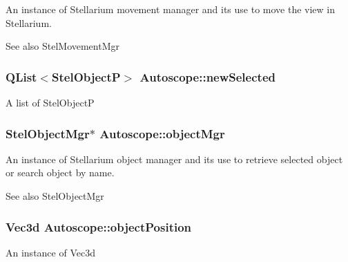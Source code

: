 An instance of Stellarium movement manager and it\textquotesingle{}s use to move the view in Stellarium. 

\begin{DoxySeeAlso}{See also}
Stel\+Movement\+Mgr 
\end{DoxySeeAlso}
\subsubsection[{\texorpdfstring{new\+Selected}{newSelected}}]{\setlength{\rightskip}{0pt plus 5cm}Q\+List$<$Stel\+ObjectP$>$ Autoscope\+::new\+Selected\hspace{0.3cm}{\ttfamily [private]}}\hypertarget{class_autoscope_aa02f096fc07e27ef3843eb4f8ba2c5a5}{}\label{class_autoscope_aa02f096fc07e27ef3843eb4f8ba2c5a5}
A list of Stel\+ObjectP 
\subsubsection[{\texorpdfstring{object\+Mgr}{objectMgr}}]{\setlength{\rightskip}{0pt plus 5cm}Stel\+Object\+Mgr$\ast$ Autoscope\+::object\+Mgr}\hypertarget{class_autoscope_aec2c452e45c0a7d045417a8656aa7c45}{}\label{class_autoscope_aec2c452e45c0a7d045417a8656aa7c45}


An instance of Stellarium object manager and it\textquotesingle{}s use to retrieve selected object or search object by name. 

\begin{DoxySeeAlso}{See also}
Stel\+Object\+Mgr 
\end{DoxySeeAlso}
\subsubsection[{\texorpdfstring{object\+Position}{objectPosition}}]{\setlength{\rightskip}{0pt plus 5cm}Vec3d Autoscope\+::object\+Position\hspace{0.3cm}{\ttfamily [private]}}\hypertarget{class_autoscope_aff4d8365cc96689c79f3370ebde45b9e}{}\label{class_autoscope_aff4d8365cc96689c79f3370ebde45b9e}
An instance of Vec3d 
